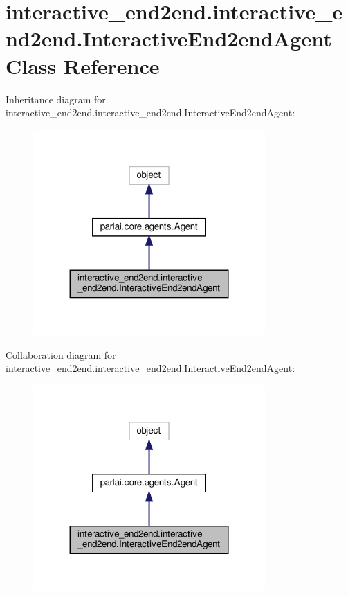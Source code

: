 \hypertarget{classinteractive__end2end_1_1interactive__end2end_1_1InteractiveEnd2endAgent}{}\section{interactive\+\_\+end2end.\+interactive\+\_\+end2end.\+Interactive\+End2end\+Agent Class Reference}
\label{classinteractive__end2end_1_1interactive__end2end_1_1InteractiveEnd2endAgent}


Inheritance diagram for interactive\+\_\+end2end.\+interactive\+\_\+end2end.\+Interactive\+End2end\+Agent\+:
\nopagebreak
\begin{figure}[H]
\begin{center}
\leavevmode
\includegraphics[width=251pt]{classinteractive__end2end_1_1interactive__end2end_1_1InteractiveEnd2endAgent__inherit__graph}
\end{center}
\end{figure}


Collaboration diagram for interactive\+\_\+end2end.\+interactive\+\_\+end2end.\+Interactive\+End2end\+Agent\+:
\nopagebreak
\begin{figure}[H]
\begin{center}
\leavevmode
\includegraphics[width=251pt]{classinteractive__end2end_1_1interactive__end2end_1_1InteractiveEnd2endAgent__coll__graph}
\end{center}
\end{figure}
